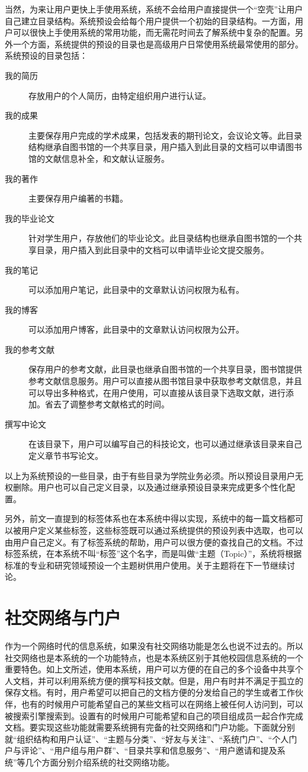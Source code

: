 当然，为来让用户更快上手使用系统，系统不会给用户直接提供一个“空壳”让用户自己建立目录结构。系统预设会给每个用户提供一个初始的目录结构。一方面，用户可以很快上手使用系统的常用功能，而无需花时间去了解系统中复杂的配置。另外一个方面，系统提供的预设的目录也是高级用户日常使用系统最常使用的部分。系统预设的目录包括：
\begin{description}
\item[我的简历] 存放用户的个人简历，由特定组织用户进行认证。
\item[我的成果] 主要保存用户完成的学术成果，包括发表的期刊论文，会议论文等。此目录结构继承自图书馆的一个共享目录，用户插入到此目录的文档可以申请图书馆的文献信息补全，和文献认证服务。
\item[我的著作] 主要保存用户编著的书籍。
\item[我的毕业论文] 针对学生用户，存放他们的毕业论文。此目录结构也继承自图书馆的一个共享目录，用户插入到此目录中的文档可以申请毕业论文提交服务。
\item[我的笔记] 可以添加用户笔记，此目录中的文章默认访问权限为私有。
\item[我的博客] 可以添加用户博客，此目录中的文章默认访问权限为公开。
\item[我的参考文献] 保存用户的参考文献，此目录也继承自图书馆的一个共享目录，图书馆提供参考文献信息服务。用户可以直接从图书馆目录中获取参考文献信息，并且可以导出多种格式，在用户使用，可以直接从该目录下选取文献，进行添加。省去了调整参考文献格式的时间。
\item[撰写中论文] 在该目录下，用户可以编写自己的科技论文，也可以通过继承该目录来自己定义章节书写论文。
\end{description}
以上为系统预设的一些目录，由于有些目录为学院业务必须。所以预设目录用户无权删除。用户也可以自己定义目录，以及通过继承预设目录来完成更多个性化配置。

另外，前文一直提到的标签体系也在本系统中得以实现，系统中的每一篇文档都可以被用户定义某些标签，这些标签既可以通过系统提供的预设列表中选取，也可以由用户自己定义。有了标签系统的帮助，用户可以很方便的查找自己的文档。不过标签系统，在本系统不叫“标签”这个名字，而是叫做“主题（Topic）”，系统将根据标准的专业和研究领域预设一个主题树供用户使用。关于主题将在下一节继续讨论。

\section{社交网络与门户}
\label{sec:society}

作为一个网络时代的信息系统，如果没有社交网络功能是怎么也说不过去的。所以社交网络也是本系统的一个功能特点，也是本系统区别于其他校园信息系统的一个重要特色。如上文所述，使用本系统，用户可以方便的在自己的多个设备中共享个人文档，并可以利用系统方便的撰写科技文献。但是，用户有时并不满足于孤立的保存文档。有时，用户希望可以把自己的文档方便的分发给自己的学生或者工作伙伴，也有的时候用户可能希望自己的某些文档可以在网络上被任何人访问到，可以被搜索引擎搜索到。设置有的时候用户可能希望和自己的项目组成员一起合作完成文档。要实现这些功能就需要系统拥有完备的社交网络和门户功能。下面就分别就“组织结构和用户认证”、“主题与分类”、“好友与关注”、“系统门户”、“个人门户与评论”、“用户组与用户群”、“目录共享和信息服务”、“用户邀请和提及系统”等几个方面分别介绍系统的社交网络功能。

